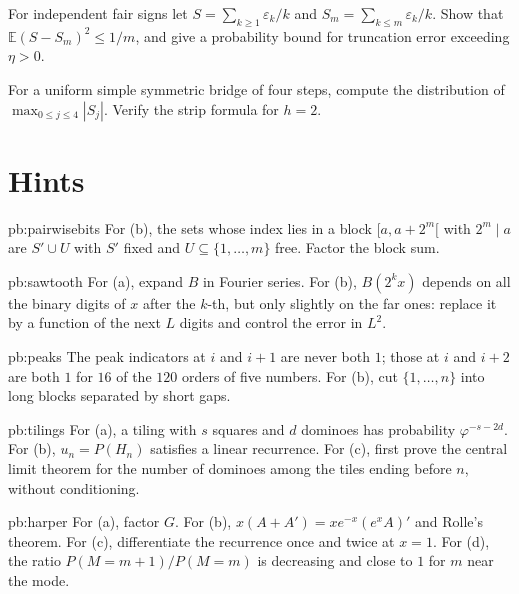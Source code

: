\begin{exercise}[$\star\star$]\label{pb:v11-ch14-series-tail}
For independent fair signs let $S=\sum_{k\ge1}\varepsilon_k/k$ and $S_m=\sum_{k\le m}\varepsilon_k/k$. Show that $\mathbb E(S-S_m)^2\le1/m$, and give a probability bound for truncation error exceeding $\eta>0$.
\end{exercise}

\begin{exercise}[$\star\star$]\label{pb:v11-ch14-bridge-four}
For a uniform simple symmetric bridge of four steps, compute the distribution of $\max_{0\le j\le4}|S_j|$. Verify the strip formula for $h=2$.
\end{exercise}

\section*{Hints}

\begin{hint}{pb:pairwisebits}
For (b), the sets whose index lies in a block $[a,a+2^m[$ with $2^m\mid a$ are $S'\cup U$ with $S'$ fixed and $U\subseteq\{1,\dots,m\}$ free. Factor the block sum.
\end{hint}

\begin{hint}{pb:sawtooth}
For (a), expand $B$ in Fourier series. For (b), $B(2^kx)$ depends on all the binary digits of $x$ after the $k$-th, but only slightly on the far ones:
replace it by a function of the next $L$ digits and control the error in $L^2$.
\end{hint}

\begin{hint}{pb:peaks}
The peak indicators at $i$ and $i+1$ are never both $1$; those at $i$ and $i+2$ are both $1$ for $16$ of the $120$ orders of five numbers. For (b), cut
$\{1,\dots,n\}$ into long blocks separated by short gaps.
\end{hint}

\begin{hint}{pb:tilings}
For (a), a tiling with $s$ squares and $d$ dominoes has probability $\varphi^{-s-2d}$. For (b), $u_n=P(H_n)$ satisfies a linear recurrence. For (c), first prove
the central limit theorem for the number of dominoes among the tiles ending before $n$, without conditioning.
\end{hint}

\begin{hint}{pb:harper}
For (a), factor $G$. For (b), $x(A+A')=xe^{-x}(e^xA)'$ and Rolle's theorem. For (c), differentiate the recurrence once and twice at $x=1$.
For (d), the ratio $P(M=m+1)/P(M=m)$ is decreasing and close to $1$ for $m$ near the mode.
\end{hint}

